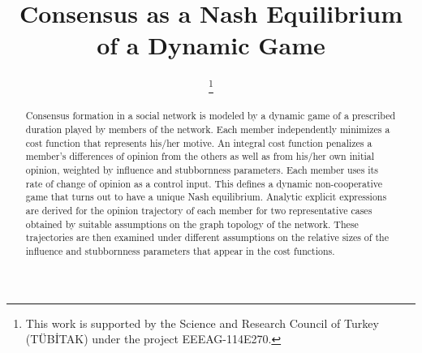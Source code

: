\documentclass[10pt, conference, compsocconf]{IEEEtran}
\begin{document}
\title{Consensus as a Nash Equilibrium of a
Dynamic Game}


\author{
\thanks{This work is supported by the Science and Research Council of Turkey (T\"{U}B\.{I}TAK) under the project EEEAG-114E270.}
\and
{}
\and
{}
}


\maketitle


\begin{abstract}
Consensus formation in a social network is modeled by a dynamic game of a prescribed duration played by members of the network. Each member independently minimizes a cost function that represents his/her motive. An integral cost function penalizes a member's differences of opinion from the others as well as from his/her own initial opinion, weighted by influence and stubbornness parameters.  Each member uses its rate of change of opinion as a control input.  This defines a dynamic non-cooperative game that turns out to have a unique Nash equilibrium.  Analytic explicit expressions are derived  for the opinion trajectory of each member for two representative cases obtained by suitable assumptions on the graph topology of the network. These trajectories are then examined under different assumptions on the relative sizes of the influence and stubbornness parameters that appear in the cost functions.
\end{abstract}
\end{document}
